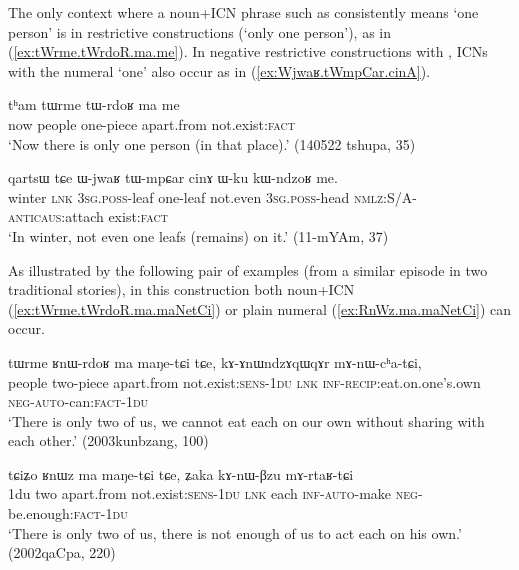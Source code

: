 The only context where a noun+ICN phrase such as  consistently means `one person' is in restrictive constructions (`only one person'), as in (\ref{ex:tWrme.tWrdoR.ma.me}).  In negative restrictive constructions with , ICNs with the numeral  `one' also occur as in (\ref{ex:Wjwaʁ.tWmpCar.cinA}).

\begin{exe}
\ex \label{ex:tWrme.tWrdoR.ma.me}
\gll tʰam tɯrme tɯ-rdoʁ ma me \\
now people one-piece apart.from not.exist:\textsc{fact} \\
\glt `Now there is only one person (in that place).' (140522 tshupa, 35)
\end{exe} 

\begin{exe}
\ex \label{ex:Wjwaʁ.tWmpCar.cinA}
\gll   qartsɯ tɕe ɯ-jwaʁ tɯ-mpɕar cinɤ ɯ-ku kɯ-ndzoʁ me.  \\
winter \textsc{lnk} \textsc{3sg}.\textsc{poss}-leaf one-leaf not.even \textsc{3sg}.\textsc{poss}-head \textsc{nmlz}:S/A-\textsc{anticaus}:attach exist:\textsc{fact} \\ 
\glt `In winter, not even one leafs (remains) on it.' (11-mYAm, 37)
\end{exe} 
As illustrated by the following pair of examples (from a similar episode in two traditional stories), in this construction both noun+ICN  (\ref{ex:tWrme.tWrdoR.ma.maNetCi})  or plain numeral (\ref{ex:RnWz.ma.maNetCi}) can occur.

\begin{exe}
\ex \label{ex:tWrme.tWrdoR.ma.maNetCi}
\gll tɯrme ʁnɯ-rdoʁ ma maŋe-tɕi tɕe, kɤ-ɤnɯndzɤqɯqɤr mɤ-nɯ-cʰa-tɕi, \\
people two-piece apart.from not.exist:\textsc{sens}-\textsc{1du} \textsc{lnk} \textsc{inf}-\textsc{recip}:eat.on.one's.own \textsc{neg}-\textsc{auto}-can:\textsc{fact}-\textsc{1du} \\
\glt `There is only two of us, we cannot eat each on our own without sharing with each other.' (2003kunbzang, 100)
\end{exe} 

\begin{exe}
\ex \label{ex:RnWz.ma.maNetCi}
\gll  tɕiʑo ʁnɯz ma maŋe-tɕi tɕe, ʑaka kɤ-nɯ-βzu mɤ-rtaʁ-tɕi \\
1du two apart.from not.exist:\textsc{sens}-\textsc{1du} \textsc{lnk} each \textsc{inf}-\textsc{auto}-make \textsc{neg}-be.enough:\textsc{fact}-\textsc{1du} \\
\glt  `There is only two of us, there is not enough of us to act each on his own.' (2002qaCpa, 220)
\end{exe} 

